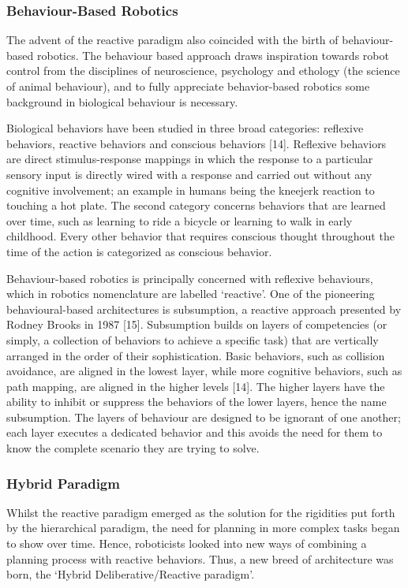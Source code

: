 \documentclass{article}
\begin{document}
	\subsubsection{Behaviour-Based Robotics}
	The advent of the reactive paradigm also coincided with the birth of behaviour-based robotics. The behaviour based approach draws inspiration towards robot control from the disciplines of neuroscience, psychology and ethology (the science of animal behaviour), and to fully appreciate behavior-based robotics some background in biological behaviour is necessary.

Biological behaviors have been studied in three broad categories: reflexive behaviors, reactive behaviors and conscious behaviors [14]. Reflexive behaviors are direct stimulus-response mappings in which the response to a particular sensory input is directly wired with a response and carried out without any cognitive involvement; an example in humans being the kneejerk reaction to touching a hot plate. The second category concerns behaviors that are learned over time, such as learning to ride a bicycle or learning to walk in early childhood. Every other behavior that requires conscious thought throughout the time of the action is categorized as conscious behavior. 

Behaviour-based robotics is principally concerned with reflexive behaviours, which in robotics nomenclature are labelled ‘reactive’. One of the pioneering behavioural-based architectures is subsumption, a reactive approach presented by Rodney Brooks in 1987 [15]. Subsumption builds on layers of competencies (or simply, a collection of behaviors to achieve a specific task) that are vertically arranged in the order of their sophistication. Basic behaviors, such as collision avoidance, are aligned in the lowest layer, while more cognitive behaviors, such as path mapping, are aligned in the higher levels [14]. The higher layers have the ability to inhibit or suppress the behaviors of the lower layers, hence the name subsumption. The layers of behaviour are designed to be ignorant of one another; each layer executes a dedicated behavior and this avoids the need for them to know the complete scenario they are trying to solve.

	\subsubsection{Hybrid Paradigm}
	Whilst the reactive paradigm emerged as the solution for the rigidities put forth by the hierarchical paradigm, the need for planning in more complex tasks began to show over time. Hence, roboticists looked into new ways of combining a planning process with reactive behaviors. Thus, a new breed of architecture was born, the ‘Hybrid Deliberative/Reactive paradigm’. 
\end{document}
